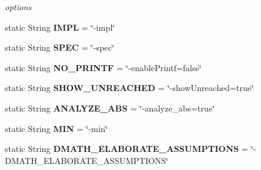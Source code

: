\begin{DoxyCompactItemize}
\begin{DoxyCompactList}\small\item\em options \end{DoxyCompactList}\item 
\hypertarget{classedu_1_1udel_1_1cis_1_1vsl_1_1civl_1_1TestConstants_a591d74fb53cec197b5a76e8d02b54afe}{}static String {\bfseries I\+M\+P\+L} = \char`\"{}-\/impl\char`\"{}\label{classedu_1_1udel_1_1cis_1_1vsl_1_1civl_1_1TestConstants_a591d74fb53cec197b5a76e8d02b54afe}

\item 
\hypertarget{classedu_1_1udel_1_1cis_1_1vsl_1_1civl_1_1TestConstants_ad9c46290baed02f12b292efaa01247f7}{}static String {\bfseries S\+P\+E\+C} = \char`\"{}-\/spec\char`\"{}\label{classedu_1_1udel_1_1cis_1_1vsl_1_1civl_1_1TestConstants_ad9c46290baed02f12b292efaa01247f7}

\item 
\hypertarget{classedu_1_1udel_1_1cis_1_1vsl_1_1civl_1_1TestConstants_a5d54b86174c90926926d2b5994437c7b}{}static String {\bfseries N\+O\+\_\+\+P\+R\+I\+N\+T\+F} = \char`\"{}-\/enable\+Printf=false\char`\"{}\label{classedu_1_1udel_1_1cis_1_1vsl_1_1civl_1_1TestConstants_a5d54b86174c90926926d2b5994437c7b}

\item 
\hypertarget{classedu_1_1udel_1_1cis_1_1vsl_1_1civl_1_1TestConstants_a95c03003fdf860e54c9aef1dc5f4cc7d}{}static String {\bfseries S\+H\+O\+W\+\_\+\+U\+N\+R\+E\+A\+C\+H\+E\+D} = \char`\"{}-\/show\+Unreached=true\char`\"{}\label{classedu_1_1udel_1_1cis_1_1vsl_1_1civl_1_1TestConstants_a95c03003fdf860e54c9aef1dc5f4cc7d}

\item 
\hypertarget{classedu_1_1udel_1_1cis_1_1vsl_1_1civl_1_1TestConstants_a22944fb9fef2b19537f674a337356679}{}static String {\bfseries A\+N\+A\+L\+Y\+Z\+E\+\_\+\+A\+B\+S} = \char`\"{}-\/analyze\+\_\+abs=true\char`\"{}\label{classedu_1_1udel_1_1cis_1_1vsl_1_1civl_1_1TestConstants_a22944fb9fef2b19537f674a337356679}

\item 
\hypertarget{classedu_1_1udel_1_1cis_1_1vsl_1_1civl_1_1TestConstants_a7ad1d964216c0eb998d29feb64b67ccb}{}static String {\bfseries M\+I\+N} = \char`\"{}-\/min\char`\"{}\label{classedu_1_1udel_1_1cis_1_1vsl_1_1civl_1_1TestConstants_a7ad1d964216c0eb998d29feb64b67ccb}

\item 
\hypertarget{classedu_1_1udel_1_1cis_1_1vsl_1_1civl_1_1TestConstants_a5f76227dd68be87b2aabc98d1332b97c}{}static String {\bfseries D\+M\+A\+T\+H\+\_\+\+E\+L\+A\+B\+O\+R\+A\+T\+E\+\_\+\+A\+S\+S\+U\+M\+P\+T\+I\+O\+N\+S} = \char`\"{}-\/D\+M\+A\+T\+H\+\_\+\+E\+L\+A\+B\+O\+R\+A\+T\+E\+\_\+\+A\+S\+S\+U\+M\+P\+T\+I\+O\+N\+S\char`\"{}\label{classedu_1_1udel_1_1cis_1_1vsl_1_1civl_1_1TestConstants_a5f76227dd68be87b2aabc98d1332b97c}


\end{DoxyCompactItemize}
